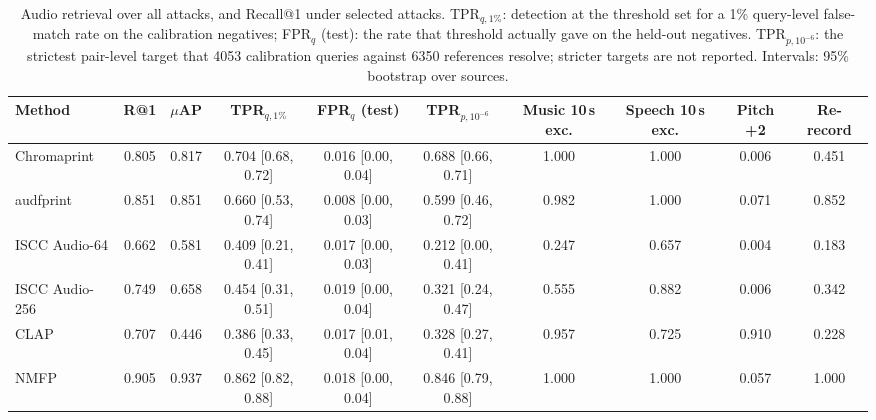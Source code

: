 \begin{table}[!t]
\centering
\scriptsize
\caption{Audio retrieval over all attacks, and Recall@1 under selected attacks. TPR$_{q,1\%}$: detection at the threshold set for a 1\% query-level false-match rate on the calibration negatives; FPR$_q$ (test): the rate that threshold actually gave on the held-out negatives. TPR$_{p,10^{-6}}$: the strictest pair-level target that 4053 calibration queries against 6350 references resolve; stricter targets are not reported. Intervals: 95\% bootstrap over sources.}
\label{tab:fp-audio}
\setlength{\tabcolsep}{3pt}
\begin{tabular}{lccccccccc}
\toprule
Method & R@1 & $\mu$AP & TPR$_{q,1\%}$ & FPR$_{q}$ (test) & TPR$_{p,10^{-6}}$ & Music 10\,s exc. & Speech 10\,s exc. & Pitch +2 & Re-record \\
\midrule
Chromaprint & 0.805 & 0.817 & 0.704 \tiny[0.68, 0.72] & 0.016 \tiny[0.00, 0.04] & 0.688 \tiny[0.66, 0.71] & 1.000 & 1.000 & 0.006 & 0.451 \\
audfprint & 0.851 & 0.851 & 0.660 \tiny[0.53, 0.74] & 0.008 \tiny[0.00, 0.03] & 0.599 \tiny[0.46, 0.72] & 0.982 & 1.000 & 0.071 & 0.852 \\
ISCC Audio-64 & 0.662 & 0.581 & 0.409 \tiny[0.21, 0.41] & 0.017 \tiny[0.00, 0.03] & 0.212 \tiny[0.00, 0.41] & 0.247 & 0.657 & 0.004 & 0.183 \\
ISCC Audio-256 & 0.749 & 0.658 & 0.454 \tiny[0.31, 0.51] & 0.019 \tiny[0.00, 0.04] & 0.321 \tiny[0.24, 0.47] & 0.555 & 0.882 & 0.006 & 0.342 \\
CLAP & 0.707 & 0.446 & 0.386 \tiny[0.33, 0.45] & 0.017 \tiny[0.01, 0.04] & 0.328 \tiny[0.27, 0.41] & 0.957 & 0.725 & 0.910 & 0.228 \\
NMFP & 0.905 & 0.937 & 0.862 \tiny[0.82, 0.88] & 0.018 \tiny[0.00, 0.04] & 0.846 \tiny[0.79, 0.88] & 1.000 & 1.000 & 0.057 & 1.000 \\
\bottomrule
\end{tabular}

\end{table}
